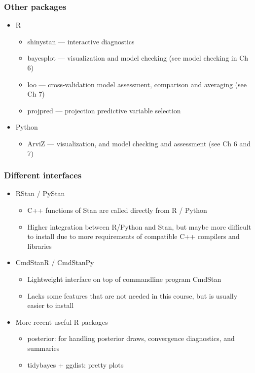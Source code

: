 \documentclass[10pt,handout]{beamer}
\begin{document}
\begin{frame}[fragile]

\frametitle{Other packages}

  \begin{itemize}
  \item R
    \begin{itemize}
    \item shinystan --- interactive diagnostics
    \item bayesplot --- visualization and model checking (see model checking in Ch 6)
    \item loo --- cross-validation model assessment, comparison and averaging (see Ch 7)
    \item projpred --- projection predictive variable selection
    \end{itemize}
    \vspace{\baselineskip}
  \item Python
    \begin{itemize}
    \item ArviZ --- visualization, and model checking and assessment (see Ch 6 and 7)
    \end{itemize}
  \end{itemize}

\end{frame}

\begin{frame}[fragile]

\frametitle{Different interfaces}

  \begin{itemize}
  \item RStan / PyStan
    \begin{itemize}
    \item C++ functions of Stan are called directly from R / Python
    \item Higher integration between R/Python and Stan, but maybe more
      difficult to install due to more requirements of compatible C++
      compilers and libraries
    \end{itemize}
  \item CmdStanR / CmdStanPy
    \begin{itemize}
    \item Lightweight interface on top of commandline program CmdStan
    \item Lacks some features that are not needed in this course, but
      is usually easier to install
    \end{itemize}
  \item More recent useful R packages
    \begin{itemize}
    \item posterior: for handling posterior draws, convergence diagnostics, and summaries
    \item tidybayes + ggdist: pretty plots
    \end{itemize}
  \end{itemize}

\end{frame}


\end{document}
